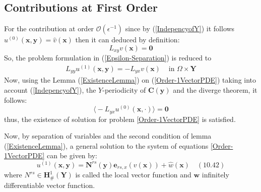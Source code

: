 \subsection{Contributions at First Order}
For the contribution at order $\mathcal{O}(\epsilon^{-1})$ since by (\ref{IndepencyofY}) it follows $u^{(0)}(\mathbf{x},\mathbf{y}) = \hat{v}(\mathbf{x})$ then it can deduced by definition:
\begin{equation*}
    L_{xy} v(\mathbf{x}) = \mathbf{0}
\end{equation*}
So, the problem formulation in (\ref{Epsilon-Separation}) is reduced to
\begin{equation*}
    \label{Order-1VectorPDE}
    \begin{array}{cc}
        L_{yy} u^{(1)}(\mathbf{x},\mathbf{y}) = - L_{yx} v(\mathbf{x}) & \text{ in } \Omega \times \mathbf{Y}
    \end{array}
\end{equation*}
Now, using the Lemma (\ref{ExistenceLemma}) on (\ref{Order-1VectorPDE}) taking into account (\ref{IndepencyofY}), the $Y$-periodicity of $\mathbf{C}(\mathbf{y})$ and the diverge theorem, it follows:
\begin{equation*}
    \big\langle - L_{yx} u^{(0)}(\mathbf{x}, \cdot) \big\rangle = \mathbf{0}
\end{equation*}
thus, the existence of solution for problem \ref{Order-1VectorPDE} is satisfied.

Now, by separation of variables and the second condition of lemma (\ref{ExistenceLemma}), a general solution to the system of equations \ref{Order-1VectorPDE} can be given by:
\begin{equation}
    \label{Order-1Ansatz}
    u^{(1)}(\mathbf{x},\mathbf{y}) = \mathbf{N}^{rs}(\mathbf{y}) \mathbf{e}_{rs,x}(v(\mathbf{x})) + \hat{w}(\mathbf{x}) \quad (10.42)
\end{equation}
where $N^{rs} \in \mathbf{H}^1_{\#}(\mathbf{Y})$ is called the local vector function and $\mathbf{w}$ infinitely differentiable vector function.


